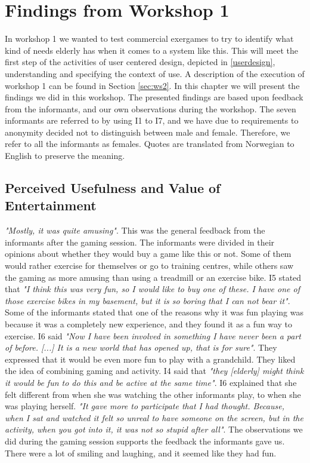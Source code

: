 \chapter{Findings from Workshop 1}
\label{chap:findW1}
In workshop 1 we wanted to test commercial exergames to try to identify what kind of needs elderly has when it comes to a system like this. This will meet the first step of the activities of user centered design, depicted in \ref{userdesign}, understanding and specifying the context of use. A description of the execution of workshop 1 can be found in Section \ref{sec:ws2}. In this chapter we will present the findings we did in this workshop. The presented findings are based upon feedback from the informants, and our own observations during the workshop. The seven informants are referred to by using I1 to I7, and we have due to requirements to anonymity decided not to distinguish between male and female. Therefore, we refer to all the informants as females. Quotes are translated from Norwegian to English to  preserve the meaning. 

\section{Perceived Usefulness and Value of Entertainment}
\emph{"Mostly, it was quite amusing"}. This was the general feedback from the informants after the gaming session. The informants were divided in their opinions about whether they would buy a game like this or not. Some of them would rather exercise for themselves or go to training centres, while others saw the gaming as more amusing than using a treadmill or an exercise bike. I5 stated that \emph{"I think this was very fun, so I would like to buy one of these. I have one of those exercise bikes in my basement, but it is so boring that I can not bear it"}.  Some of the informants stated that one of the reasons why it was fun playing was because it was a completely new experience, and they found it as a fun way to exercise. I6 said \emph{"Now I have been involved in something I have never been a part of before. [...] It is a new world that has opened up, that is for sure"}. They expressed that it would be even more fun to play with a grandchild. They liked the idea of combining gaming and activity. I4 said that \emph{"they [elderly] might think it would be fun to do this and be active at the same time"}. I6 explained that she felt different from when she was watching the other informants play, to when she was playing herself. \emph{"It gave more to participate that I had thought. Because, when I sat and watched it felt so unreal to have someone on the screen, but in the activity, when you got into it, it was not so stupid after all"}. The observations we did during the gaming session supports the feedback the informants gave us. There were a lot of smiling and laughing, and it seemed like they had fun.  

